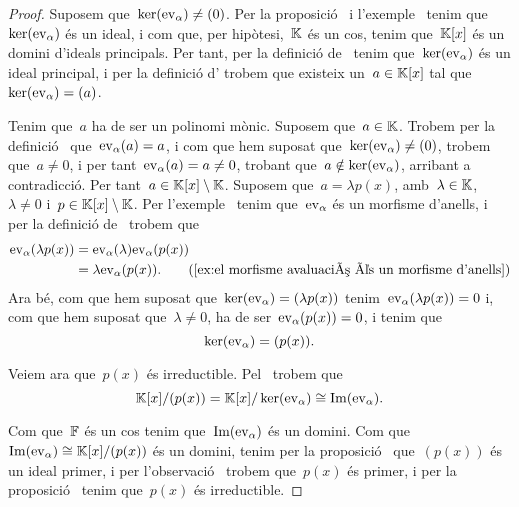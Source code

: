 \documentclass[../Apunts.tex]{subfiles}
\begin{document}
	\begin{proof} %
		Suposem que~\(\operatorname{ker}(\mathrm{ev}_{\alpha})\neq(0)\). Per la proposició~ i l'exemple~ tenim que~\(\operatorname{ker}(\mathrm{ev}_{\alpha})\) és un ideal, i com que, per hipòtesi,~\(\mathbb{K}\) és un cos, tenim que~\(\mathbb{K}[x]\) és un domini d'ideals principals. %
		Per tant, per la definició de~ tenim que~\(\operatorname{ker}(\mathrm{ev}_{\alpha})\) és un ideal principal, i per la definició d' trobem que existeix un~\(a\in\mathbb{K}[x]\) tal que~\(\operatorname{ker}(\mathrm{ev}_{\alpha})=(a)\).
		
		Tenim que~\(a\) ha de ser un polinomi mònic. Suposem que~\(a\in\mathbb{K}\). Trobem per la definició~ que~\(\mathrm{ev}_{\alpha}(a)=a\), i com que hem suposat que~\(\operatorname{ker}(\mathrm{ev}_{\alpha})\neq(0)\), trobem que~\(a\neq0\), i per tant~\(\mathrm{ev}_{\alpha}(a)=a\neq0\), trobant que~\(a\notin\operatorname{ker}(\mathrm{ev}_{\alpha})\), arribant a contradicció. Per tant~\(a\in\mathbb{K}[x]\setminus\mathbb{K}\). Suposem que~\(a=\lambda p(x)\), amb~\(\lambda\in\mathbb{K}\),~\(\lambda\neq0\) i~\(p\in\mathbb{K}[x]\setminus\mathbb{K}\). Per l'exemple~ tenim que~\(\mathrm{ev}_{\alpha}\) és un morfisme d'anells, i per la definició de~ trobem que
		\begin{align*}
			\ev_{\alpha}(\lambda p(x))&=\ev_{\alpha}(\lambda)\ev_{\alpha}(p(x))\\
			&=\lambda\ev_{\alpha}(p(x)). \tag{\ref{ex:el morfisme avaluació és un morfisme d'anells}}
		\end{align*}
		Ara bé, com que hem suposat que~\(\operatorname{ker}(\mathrm{ev}_{\alpha})=(\lambda p(x))\) tenim~\(\mathrm{ev}_{\alpha}(\lambda p(x))=0\) i, com que hem suposat que~\(\lambda\neq0\), ha de ser~\(\mathrm{ev}_{\alpha}(p(x))=0\), i tenim que
		\[\operatorname{ker}(\mathrm{ev}_{\alpha})=(p(x)).\]
		
		Veiem ara que~\(p(x)\) és irreductible. Pel~ trobem que
		\[\mathbb{K}[x]/(p(x))=\mathbb{K}[x]/\operatorname{ker}(\mathrm{ev}_{\alpha})\cong\operatorname{Im}(\mathrm{ev}_{\alpha}).\]
		
		Com que~\(\mathbb{F}\) és un cos tenim que~\(\operatorname{Im}(\mathrm{ev}_{\alpha})\) és un domini. %
		Com que~\(\operatorname{Im}(\mathrm{ev}_{\alpha})\cong\mathbb{K}[x]/(p(x))\) és un domini, tenim per la proposició~ que~\((p(x))\) és un ideal primer, i per l'observació~ trobem que~\(p(x)\) és primer, i per la proposició~ tenim que~\(p(x)\) és irreductible.
	\end{proof}
\end{document}
